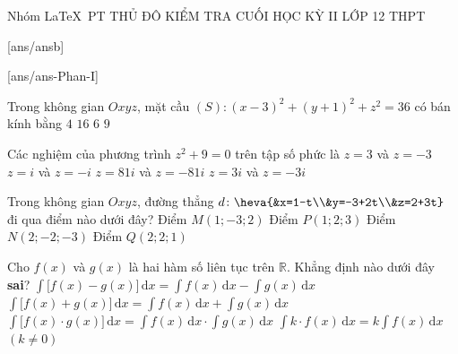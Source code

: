 \begin{name}
	{Nhóm \LaTeX\ PT THỦ ĐÔ}
	{KIỂM TRA CUỐI HỌC KỲ II LỚP 12 THPT}
\end{name}

[ans/ansb\currfilebase]


\caulc
{}[ans/ans\currfilebase-Phan-I]

\begin{ex}%
	Trong không gian $Oxyz$, mặt cầu $(S)\colon(x-3)^2+(y+1)^2+z^2=36$ có bán kính bằng
	\choice
	{$4$}
	{$16$}
	{\True $6$}
	{$9$}
\end{ex}

\begin{ex}%
	Các nghiệm của phương trình $z^2+9=0$ trên tập số phức là
	\choice
	{$z=3$ và $z=-3$}
	{$z=i$ và $z=-i$}
	{$z=81i$ và $z=-81i$}
	{\True $z=3i$ và $z=-3i$}
\end{ex}

\begin{ex}%
	Trong không gian $Oxyz$, đường thẳng $d\colon\heva{&x=1-t\\&y=-3+2t\\&z=2+3t}$ đi qua điểm nào dưới đây?
	\choice
	{\True Điểm $M(1;-3;2)$}
	{Điểm $P(1;2;3)$}
	{Điểm $N(2;-2;-3)$}
	{Điểm $Q(2;2;1)$}
\end{ex}

\begin{ex}%
	Cho $f(x)$ và $g(x)$ là hai hàm số liên tục trên $\mathbb{R}$. Khẳng định nào dưới đây \textbf{sai}?
	\choice
	{$\displaystyle\int\big[f(x)-g(x)\big]  \mathrm{\,d}x
		=\displaystyle\int f(x)\mathrm{\,d}x-\displaystyle\int g(x)\mathrm{\,d}x$}
	{$\displaystyle\int\big[f(x)+g(x)\big]  \mathrm{\,d}x=\displaystyle\int f(x)\mathrm{\,d} x+\displaystyle\int g(x)\mathrm{\,d} x$}
	{\True $\displaystyle\int\big[f(x)\cdot g(x)\big]  \mathrm{\,d}x=\displaystyle\int f(x)\mathrm{\,d}x \cdot \displaystyle\int g(x) \mathrm{\,d}x$}
	{$\displaystyle\int k \cdot f(x) \mathrm{\,d}x
		=k\displaystyle\int f(x)\mathrm{\,d}x$ $(k\neq 0)$}
\end{ex}

